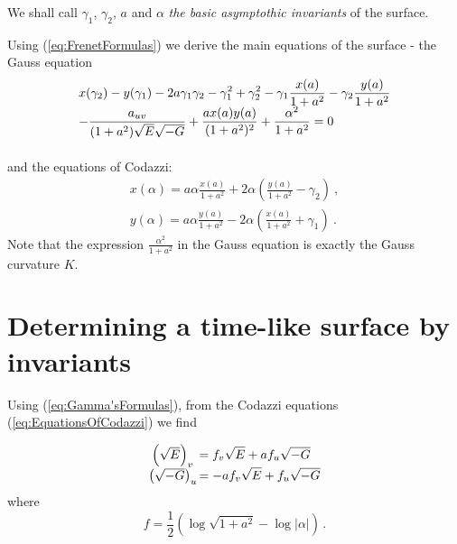 \documentclass[12pt]{amsart}
\theoremstyle{definition}
\theoremstyle{remark}
\newcommand{\ds}{\displaystyle}
\begin{document}
We shall call $\gamma_1$, $\gamma_2$, $a$ and $\alpha$  {\it the basic asymptothic invariants} of the surface.


Using (\ref{eq:FrenetFormulas}) we derive the main equations of the surface - the Gauss equation
\begin{equation} \label{eq:GaussEquation-1}
	\begin{array}{l}
		\ds x(\gamma_2)-y(\gamma_1)-2a\gamma_1\gamma_2 -\gamma_1^2+\gamma_2^2
			-\gamma_1 \frac{x(a)}{1+a^2}	-\gamma_2\frac{y(a)}{1+a^2} \\
			\ds -\frac{a_{uv}}{(1+a^2)\sqrt E\sqrt {-G}}+\frac{ax(a)y(a)}{(1+a^2)^2}
		+\frac{\alpha^2}{1+a^2}=0    \vspace{0.3cm}\\
	\end{array}
\end{equation}
and the equations of Codazzi:
\begin{equation} \label{eq:EquationsOfCodazzi}
	\begin{array}{l}
		\ds x(\alpha)= a\alpha \frac{x(a)}{1+a^2}  +2 \alpha\left(\frac{y(a)}{1+a^2}-\gamma_2 \right)  \ , \\
		\ds y(\alpha)= a\alpha \frac{y(a)}{1+a^2}-2\alpha \left(\frac{x(a)}{1+a^2}+\gamma_1\right)   \ .
	\end{array}
\end{equation}
Note that the expression $\ds \frac{\alpha^2}{1+a^2}$ in the Gauss equation is exactly the Gauss curvature $K$.


\vspace{0.5cm}





\setcounter{equation}{0}

\section{Determining a time-like surface by invariants}



Using (\ref{eq:Gamma'sFormulas}), from the Codazzi equations (\ref{eq:EquationsOfCodazzi}) we find

\begin{equation}\label{eq:System}
	\begin{array}{rl}
	 \left(\sqrt E\right)_v \hspace{-0.2cm}    &  \ds =f_v\sqrt E +af_u\sqrt{-G}  \\
	 \left(\sqrt{-G}\right)_u  \hspace{-0.3cm} &  \ds =-af_v\sqrt E +f_u\sqrt{-G}
	\end{array}
\end{equation} 
where
$$
	f=\frac12 \left( \log\sqrt{1+a^2}-\log|\alpha| \right)  \,.
$$
\end{document}
